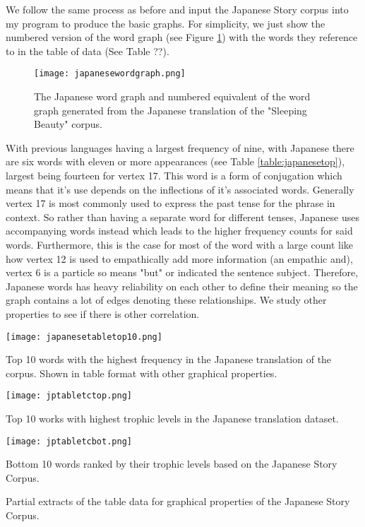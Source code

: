 We follow the same process as before and input the Japanese Story corpus into my program to produce the basic graphs. For simplicity, we just show the numbered version of the word graph (see Figure \ref{fig:jpgraph}) with the words they reference to in the table of data (See Table ??).

\begin{figure}[H]
\centering
\texttt{[image: japanesewordgraph.png]}
\caption{The Japanese word graph and numbered equivalent of the word graph generated from the Japanese translation of the "Sleeping Beauty" corpus.}
\label{fig:jpgraph}
\end{figure}

With previous languages having a largest frequency of nine, with Japanese there are six words with eleven or more appearances (see Table \ref{table:japanesetop}), largest being fourteen for vertex 17. This word is a form of conjugation which means that it's use depends on the inflections of it's associated words. Generally vertex 17 is most commonly used to express the past tense for the phrase in context. So rather than having a separate word for different tenses, Japanese uses accompanying words instead which leads to the higher frequency counts for said words. Furthermore, this is the case for most of the word with a large count like how vertex 12 is used to empathically add more information (an empathic and), vertex 6 is a particle so means "but" or indicated the sentence subject. Therefore, Japanese words has heavy reliability on each other to define their meaning so the graph contains a lot of edges denoting these relationships. We study other properties to see if there is other correlation.

\begin{table}[H]
\centering
\texttt{[image: japanesetabletop10.png]}
\caption{Top 10 words with the highest frequency in the Japanese translation of the corpus. Shown in table format with other graphical properties. }
\label{table:japanesetop}
\end{table}

\begin{table}[H]
\centering
\begin{subtable}{.45\textwidth}
	\centering
	\texttt{[image: jptabletctop.png]}
	\caption{Top 10 works with highest trophic levels in the Japanese translation dataset.}
	\label{table:japanesentoptc}
\end{subtable}
\hfill
\begin{subtable}{.45\textwidth}
	\centering
	\texttt{[image: jptabletcbot.png]}
	\caption{Bottom 10 words ranked by their trophic levels based on the Japanese Story Corpus.}
	\label{table:japanesebottc}
\end{subtable}
\caption{Partial extracts of the table data for graphical properties of the Japanese Story Corpus.}
\end{table}

